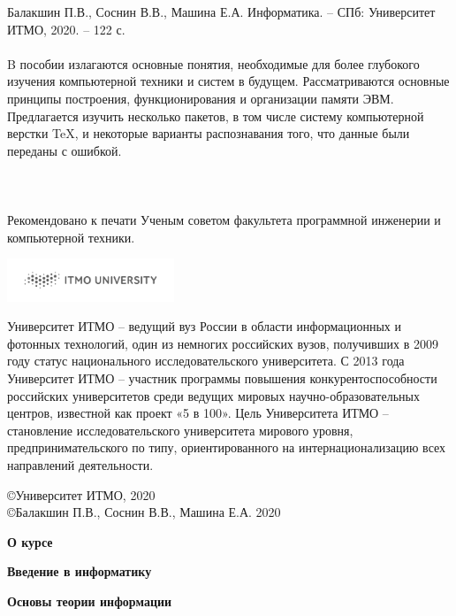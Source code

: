 \documentclass[a5paper,14pt]{report}
\begin{document}
\newpage
\begin{titlepage}
Балакшин П.В., Соснин В.В., Машина Е.А.  Информатика. – СПб: Университет ИТМО, 2020. – 122 с.
\\\\\text 
B пособии излагаются основные понятия, необходимые для более глубокого изучения компьютерной техники и систем в будущем. Рассматриваются основные принципы построения, функционирования и организации памяти ЭВМ. Предлагается изучить несколько пакетов, в том числе систему компьютерной верстки TeX, и некоторые варианты распознавания того, что данные были переданы с ошибкой.
\\\\\\\\Рекомендовано к печати Ученым советом факультета программной инженерии и компьютерной техники. 
\vspace{5 cm}
\begin{flushright}
\includegraphics[width=5cm]{ITMO_log}
\end{flushright}
Университет ИТМО – ведущий вуз России в области информационных и фотонных технологий, один из немногих российских вузов, получивших в 2009 году статус национального исследовательского университета. С 2013 года Университет ИТМО – участник программы повышения конкурентоспособности российских университетов среди ведущих мировых научно-образовательных центров, известной как проект «5 в 100». Цель Университета ИТМО – становление исследовательского университета мирового уровня, предпринимательского по типу, ориентированного на интернационализацию всех направлений деятельности. 
\begin{flushright}
\copyright Университет ИТМО, 2020
\\\copyright Балакшин П.В., Соснин В.В., Машина Е.А. 2020
\end{flushright}
\end{titlepage}

\tableofcontents
\newpage
\textbf{О курсе\\}


\newpage
\textbf{Введение в информатику\\}


\newpage
\textbf{Основы теории информации\\}

\end{document}
